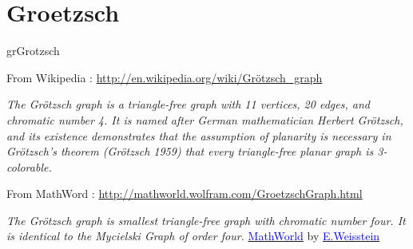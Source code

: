 \newpage\section{Groetzsch}
\begin{NewMacroBox}{grGrotzsch}{}

\medskip
From  Wikipedia : \url{http://en.wikipedia.org/wiki/Grötzsch_graph}  

\emph{The Grötzsch graph is a triangle-free graph with 11 vertices, 20 edges, and chromatic number 4. It is named after German mathematician Herbert Grötzsch, and its existence demonstrates that the assumption of planarity is necessary in Grötzsch's theorem (Grötzsch 1959) that every triangle-free planar graph is 3-colorable.}

\medskip
From MathWord : \url{http://mathworld.wolfram.com/GroetzschGraph.html} 

\emph{The Grötzsch graph is smallest triangle-free graph with chromatic number four. It is identical to the Mycielski Graph of order four.}
\href{http://mathworld.wolfram.com/topics/GraphTheory.html}%
           {\textcolor{blue}{MathWorld}} by \href{http://en.wikipedia.org/wiki/Eric_W._Weisstein}%
           {\textcolor{blue}{E.Weisstein}} 

\end{NewMacroBox}


\SetVertexNoLabel
{} 

\subsection{}

\begin{center}
    \begin{tkzexample}[vbox]
\end{tkzexample} 
\end{center}


